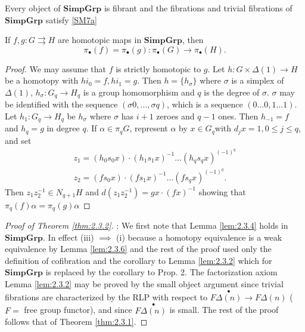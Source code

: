 \documentclass[../main]{subfiles}
\begin{document}
\begin{corollary*}
Every object of $\mathbf{SimpGrp}$ is fibrant and the fibrations and trivial fibrations of $\mathbf{SimpGrp}$ satisfy \ref{SM7a}
\end{corollary*}

\begin{lemma}\label{lem:2.3.6}
    If $f, g \colon G \rightrightarrows H$ are homotopic maps in $\mathbf{SimpGrp}$, then \[\pi_{\bullet} (f)  = \pi_{\bullet}(g) \colon \pi_{\bullet}(G) \longrightarrow \pi_{\bullet} (H).\]
\end{lemma}

\begin{proof}
We may assume that $f$ is strictly homotopic to $g$. Let $h \colon G \times \Delta(1) \longrightarrow H$ be a homotopy with $hi_{0} = f, hi_{1} = g$. Then $h = \{h_{\sigma}\}$ where $\sigma$ is a simplex of $\Delta(1)$, $h_{\sigma} \colon G_{q} \longrightarrow H_{q}$ is a group homomorphism and $q$ is the degree of $\sigma$. $\sigma$ may be identified with the sequence $(\sigma 0, \ldots, \sigma q)$, which is a sequence $(0 \ldots 0, 1 \ldots 1)$. Let $h_{1} \colon G_{q} \longrightarrow H_{q}$ be $h_{\sigma}$ where $\sigma$ has $i+1$ zeroes and $q-1$ ones. Then $h_{-1} = f$ and $h_{q} =g$ in degree $q$. If $\alpha \in \pi_q G$, represent $\alpha$ by $x \in G_{q}$with $d_{j}x = 1, 0 \leq j \leq q$, and set
\begin{gather*}
    z_1 = (h_0 s_0 x) \cdot (h_1 s_1 x)^{-1} \ldots (h_{q} s_{q} x)^{(-1)^{q}} \\
    z_2 = (f s_0 x) \cdot (f s_1 x)^{-1} \ldots (f s_{q} x)^{(-1)^{q}}
.\end{gather*}
Then $z_1 z_2^{-1} \in N_{q+1} H$ and $d(z_1 z_2^{-1}) = gx \cdot (fx)^{-1}$ showing that $\pi_{q}(f)\alpha = \pi_q (g) \alpha$
\end{proof}

\begin{proof}[Proof of Theorem \ref{thm:2.3.2}]: 
We first note that Lemma \ref{lem:2.3.4} holds in $\mathbf{SimpGrp}$. In effect (iii) $\implies$ (i) 
because a homotopy equivalence is a weak equivalence by Lemma \ref{lem:2.3.6} and the rest of the proof used only the definition of cofibration and the corollary to Lemma \ref{lem:2.3.2} which for $\mathbf{SimpGrp}$ is replaced by the corollary to Prop. 2. The factorization axiom Lemma \ref{lem:2.3.2} may be proved by the small object argument since trivial fibrations are characterized by the RLP with respect to $F\overset{\bullet}{\Delta(n)} \longrightarrow F \Delta (n)$ ($F = $ free group functor), and since $F\overset{\bullet}{\Delta(n)}$ is small. The rest of the proof follows that of Theorem \ref{thm:2.3.1}.
\end{proof}
\end{document}
